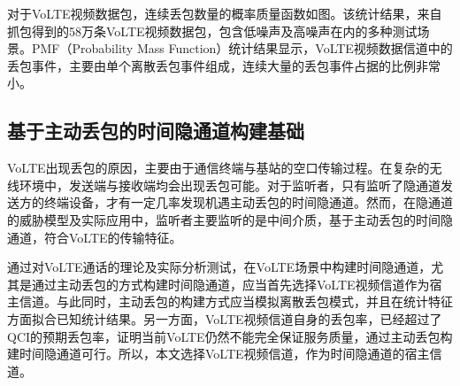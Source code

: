 
对于VoLTE视频数据包，连续丢包数量的概率质量函数如图。该统计结果，来自抓包得到的58万条VoLTE视频数据包，包含低噪声及高噪声在内的多种测试场景。PMF（Probability Mass Function）统计结果显示，VoLTE视频数据信道中的丢包事件，主要由单个离散丢包事件组成，连续大量的丢包事件占据的比例非常小。

\subsection{基于主动丢包的时间隐通道构建基础}
\label{chap:backinfo:volte:scheme}
VoLTE出现丢包的原因，主要由于通信终端与基站的空口传输过程。在复杂的无线环境中，发送端与接收端均会出现丢包可能。对于监听者，只有监听了隐通道发送方的终端设备，才有一定几率发现机遇主动丢包的时间隐通道。然而，在隐通道的威胁模型及实际应用中，监听者主要监听的是中间介质，基于主动丢包的时间隐通道，符合VoLTE的传输特征。

通过对VoLTE通话的理论及实际分析测试，在VoLTE场景中构建时间隐通道，尤其是通过主动丢包的方式构建时间隐通道，应当首先选择VoLTE视频信道作为宿主信道。与此同时，主动丢包的构建方式应当模拟离散丢包模式，并且在统计特征方面拟合已知统计结果。另一方面，VoLTE视频信道自身的丢包率，已经超过了QCI的预期丢包率，证明当前VoLTE仍然不能完全保证服务质量，通过主动丢包构建时间隐通道可行。所以，本文选择VoLTE视频信道，作为时间隐通道的宿主信道。
